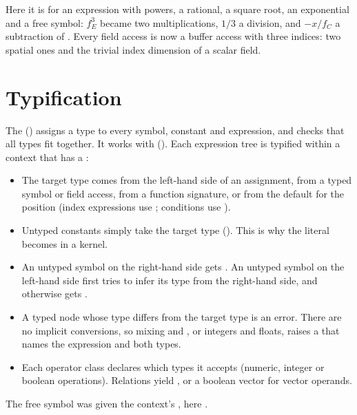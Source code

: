 Here it is for an expression with powers, a rational, a square root, an exponential and
a free symbol:
$f_E^3$ became two multiplications, $1/3$ a division, and $-x/f_C$ a subtraction of
. Every field access is now a buffer access with three indices: two
spatial ones and the trivial index dimension of a scalar field.

\section{Typification}\label{r01:sec:typify}

The  () assigns a type to every symbol, constant
and expression, and checks that all types fit together. It works with
 (). Each expression tree is typified within a
context that has a :
\begin{itemize}
  \item The target type comes from the left-hand side of an assignment, from a typed
        symbol or field access, from a function signature, or from the default for the
        position (index expressions use ; conditions use ).
  \item Untyped constants simply take the target type (). This is why
        the literal  becomes  in a  kernel.
  \item An untyped symbol on the right-hand side gets . An untyped
        symbol on the left-hand side first tries to infer its type from the right-hand
        side, and otherwise gets .
  \item A typed node whose type differs from the target type is an error. There are no
        implicit conversions, so mixing  and , or integers and
        floats, raises a  that names the expression and both
        types.
  \item Each operator class declares which types it accepts (numeric, integer or
        boolean operations). Relations yield , or a boolean vector for vector
        operands.
\end{itemize}
The free symbol  was given the context's , here
.

